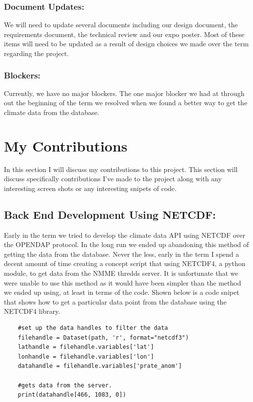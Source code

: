 \documentclass[onecolumn, draftclsnofoot,10pt, compsoc]{article}
\begin{document}
		\subsubsection{Document Updates:}
		We will need to update several documents including our design document, the requirements document, the technical review and our expo poster. Most of these items will need to be updated as a result of design choices we made over the term regarding the project.\\

		\subsubsection{Blockers:}
		Currently, we have no major blockers. The one major blocker we had at through out the beginning of the term we resolved when we found a better way to get the climate data from the database.\\

\section{My Contributions}
	In this section I will discuss my contributions to this project. This section will discuss specifically contributions I've made to the project along with any interesting screen shots or any interesting snipets of code.\\

		\subsection{Back End Development Using NETCDF:}
		Early in the term we tried to develop the climate data API using NETCDF over the OPENDAP protocol. In the long run we ended up abandoning this method of getting the data from the database. Never the less, early in the term I spend a decent amount of time creating a concept script that using NETCDF4, a python module, to get data from the NMME thredds server. It is unfortunate that we were unable to use this method as it would have been simpler than the method we ended up using, at least in terms of the code. Shown below is a code snipet that shows how to get a particular data point from the database using the NETCDF4 library.\\
		
\begin{lstlisting}
	#set up the data handles to filter the data
	filehandle = Dataset(path, 'r', format="netcdf3")
	lathandle = filehandle.variables['lat']
	lonhandle = filehandle.variables['lon']
	datahandle = filehandle.variables['prate_anom']

	#gets data from the server.
	print(datahandle[466, 1083, 0])
\end{lstlisting}
		
\end{document}
